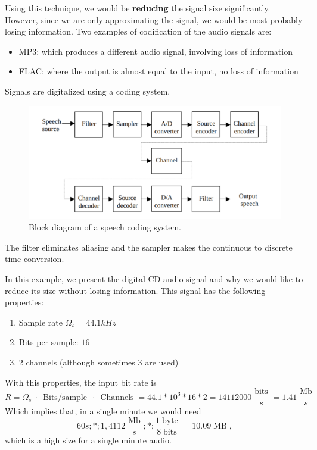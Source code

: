   Using this technique, we would be \textbf{reducing} the signal size significantly. However, since we are only approximating the signal, we would be most probably losing information. Two examples of codification of the audio signals are:

  \begin{itemize}
    \item MP3: which produces a different audio signal, involving loss of information
          \item FLAC: where the output is almost equal to the input, no loss of information
\end{itemize}

Signals are digitalized using a coding system.

\begin{figure}[!h]
  \centering
  \includegraphics[scale=0.5]{Figures/SpeechCodingSystem}
  \caption{Block diagram of a speech coding system.}
\end{figure}

The filter eliminates aliasing and the sampler makes the continuous to discrete time conversion.

\begin{example}
  In this example, we present the digital CD audio signal and why we would like to reduce its size without losing information. This signal has the following properties:

  \begin{enumerate}
    \item Sample rate \(\Omega_{s} = 44.1 kHz\)
    \item Bits per sample: \(16\)
          \item 2 channels (although sometimes 3 are used)
  \end{enumerate}

  With this properties, the input bit rate is
  \[
    R = \Omega_{s} \ \cdot \ \operatorname{Bits/sample} \ \cdot \ \operatorname{Channels} = 44.1*10^{3} * 16 * 2 = 14112000 \frac{\operatorname{bits}}{s} = 1.41 \frac{\operatorname{Mb}}{s}
  \]
  Which implies that, in a single minute we would need
  \[
    60s ; * ; 1,4112 \frac{\operatorname{Mb}}{s} ; * ; \frac{1 \operatorname{byte}}{8 \operatorname{bits}} = 10.09 \operatorname{MB},
  \]
  which is a high size for a single minute audio.
\end{example}

